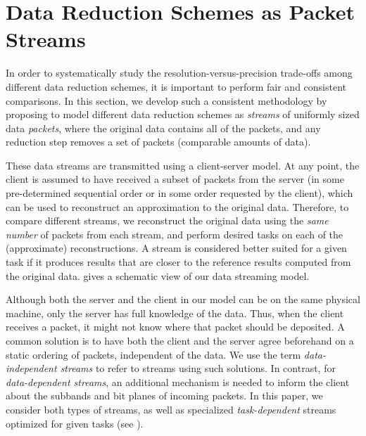 \section{Data Reduction Schemes as Packet Streams}\label{sec:terminologies}

In order to systematically study the resolution-versus-precision trade-offs among different data
reduction schemes, it is important to perform fair and consistent comparisons. In this section, we
develop such a consistent methodology by proposing to model different data reduction schemes as
\emph{streams} of uniformly sized data \emph{packets}, where the original data contains all of the
packets, and any reduction step removes a set of packets (comparable amounts of data).

These data streams are transmitted using a client-server model. At any point, the client is assumed
to have received a subset of packets from the server (in some pre-determined sequential order or in
some order requested by the client), which can be used to reconstruct an approximation to the
original data. Therefore, to compare different streams, we reconstruct the original data using the
\emph{same number} of packets from each stream, and perform desired tasks on each of the
(approximate) reconstructions. A stream is considered better suited for a given task if it produces
results that are closer to the reference results computed from the original data.
 gives a schematic view of our data streaming model.

Although both the server and the client in our model can be on the same physical machine, only the
server has full knowledge of the data. Thus, when the client receives a packet, it might not know
where that packet should be deposited. A common solution is to have both the client and the server
agree beforehand on a static ordering of packets, independent of the data. We use the term
\emph{data-independent streams} to refer to streams using such solutions. In contrast, for
\emph{data-dependent streams}, an additional mechanism is needed to inform the client about the
subbands and bit planes of incoming packets. In this paper, we consider both types of streams, as
well as specialized \emph{task-dependent} streams optimized for given tasks (see
).

